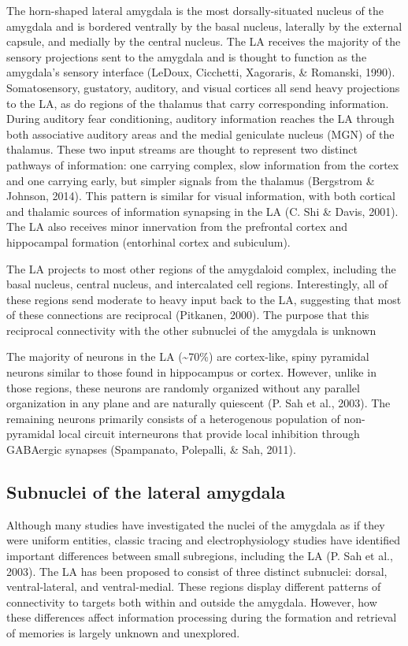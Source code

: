 \documentclass[12pt,a4paperpaper,]{report}
\begin{document}
The horn-shaped lateral amygdala is the most dorsally-situated nucleus
of the amygdala and is bordered ventrally by the basal nucleus,
laterally by the external capsule, and medially by the central nucleus.
The LA receives the majority of the sensory projections sent to the
amygdala and is thought to function as the amygdala's sensory interface
(LeDoux, Cicchetti, Xagoraris, \& Romanski, 1990). Somatosensory,
gustatory, auditory, and visual cortices all send heavy projections to
the LA, as do regions of the thalamus that carry corresponding
information. During auditory fear conditioning, auditory information
reaches the LA through both associative auditory areas and the medial
geniculate nucleus (MGN) of the thalamus. These two input streams are
thought to represent two distinct pathways of information: one carrying
complex, slow information from the cortex and one carrying early, but
simpler signals from the thalamus (Bergstrom \& Johnson, 2014). This
pattern is similar for visual information, with both cortical and
thalamic sources of information synapsing in the LA (C. Shi \& Davis,
2001). The LA also receives minor innervation from the prefrontal cortex
and hippocampal formation (entorhinal cortex and subiculum).

The LA projects to most other regions of the amygdaloid complex,
including the basal nucleus, central nucleus, and intercalated cell
regions. Interestingly, all of these regions send moderate to heavy
input back to the LA, suggesting that most of these connections are
reciprocal (Pitkanen, 2000). The purpose that this reciprocal
connectivity with the other subnuclei of the amygdala is unknown

The majority of neurons in the LA (\textasciitilde{}70\%) are
cortex-like, spiny pyramidal neurons similar to those found in
hippocampus or cortex. However, unlike in those regions, these neurons
are randomly organized without any parallel organization in any plane
and are naturally quiescent (P. Sah et al., 2003). The remaining neurons
primarily consists of a heterogenous population of non-pyramidal local
circuit interneurons that provide local inhibition through GABAergic
synapses (Spampanato, Polepalli, \& Sah, 2011).

\subsection{Subnuclei of the lateral
amygdala}\label{subnuclei-of-the-lateral-amygdala}

Although many studies have investigated the nuclei of the amygdala as if
they were uniform entities, classic tracing and electrophysiology
studies have identified important differences between small subregions,
including the LA (P. Sah et al., 2003). The LA has been proposed to
consist of three distinct subnuclei: dorsal, ventral-lateral, and
ventral-medial. These regions display different patterns of connectivity
to targets both within and outside the amygdala. However, how these
differences affect information processing during the formation and
retrieval of memories is largely unknown and unexplored.
\end{document}
